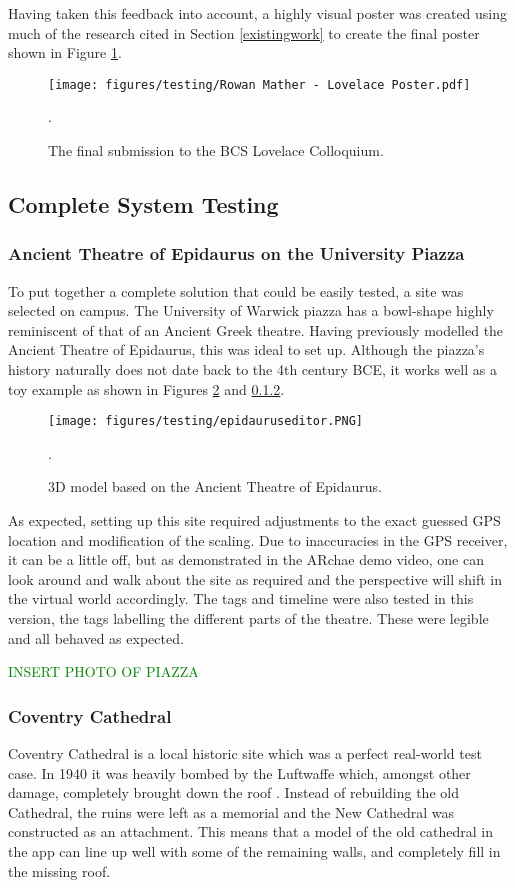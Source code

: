 \documentclass[12pt, a4paper]{article}
\newcommand{\could}[1]{\textcolor{green}{#1}}
\begin{document}
Having taken this feedback into account, a highly visual poster was created using much of the research cited in Section \ref{existingwork} to create the final poster shown in Figure \ref{fig:bcsposter}. 

\begin{figure}
\centering
    \texttt{[image: figures/testing/Rowan Mather - Lovelace Poster.pdf]}
        \caption{The final submission to the BCS Lovelace Colloquium.}.
        \label{fig:bcsposter}
\end{figure}

\subsection{Complete System Testing}

\subsubsection{Ancient Theatre of Epidaurus on the University Piazza}
To put together a complete solution that could be easily tested, a site was selected on campus. The University of Warwick piazza has a bowl-shape highly reminiscent of that of an Ancient Greek theatre. Having previously modelled the Ancient Theatre of Epidaurus, this was ideal to set up. Although the piazza's history naturally does not date back to the 4th century BCE, it works well as a toy example as shown in Figures \ref{fig:epidaurus} and \ref{}.

\begin{figure}
\centering
    \texttt{[image: figures/testing/epidauruseditor.PNG]}
        \caption{3D model based on the Ancient Theatre of Epidaurus.}.
        \label{fig:epidaurus}
\end{figure}

As expected, setting up this site required adjustments to the exact guessed GPS location and modification of the scaling. Due to inaccuracies in the GPS receiver, it can be a little off, but as demonstrated in the ARchae demo video, one can look around and walk about the site as required and the perspective will shift in the virtual world accordingly. The tags and timeline were also tested in this version, the tags labelling the different parts of the theatre. These were legible and all behaved as expected.

\could{INSERT PHOTO OF PIAZZA}

\subsubsection{Coventry Cathedral}
Coventry Cathedral is a local historic site which was a perfect real-world test case. In 1940 it was heavily bombed by the Luftwaffe which, amongst other damage, completely brought down the roof \cite{testing:covhistory}. Instead of rebuilding the old Cathedral, the ruins were left as a memorial and the New Cathedral was constructed as an attachment. This means that a model of the old cathedral in the app can line up well with some of the remaining walls, and completely fill in the missing roof. 
\end{document}
